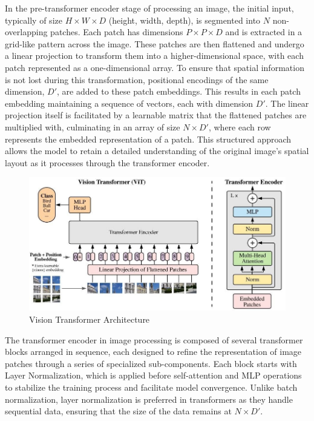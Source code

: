 In the pre-transformer encoder stage of processing an image, the initial input, typically of size \(H \times W \times D\) (height, width, depth), 
is segmented into \(N\) non-overlapping patches. Each patch has dimensions \(P \times P \times D\) and is extracted in a grid-like pattern across 
the image. These patches are then flattened and undergo a linear projection to transform them into a higher-dimensional space, with each patch represented 
as a one-dimensional array. To ensure that spatial information is not lost during this transformation, positional encodings of the same dimension, 
\(D'\), are added to these patch embeddings. This results in each patch embedding maintaining a sequence of vectors, each with dimension \(D'\). 
The linear projection itself is facilitated by a learnable matrix that the flattened patches are multiplied with, culminating in an array of size 
\(N \times D'\), where each row represents the embedded representation of a patch. This structured approach allows the model to retain a detailed 
understanding of the original image’s spatial layout as it processes through the transformer encoder.


\begin{figure}[h!]
    \centering
    \includegraphics[scale=0.45]{Figures/vision-transformer.jpg}
    \caption{Vision Transformer Architecture}
    \label{fig:tr-vit}
\end{figure}


The transformer encoder in image processing is composed of several transformer blocks arranged in sequence, each designed to refine the representation of image 
patches through a series of specialized sub-components. Each block starts with Layer Normalization, which is applied before self-attention and MLP operations 
to stabilize the training process and facilitate model convergence. Unlike batch normalization, layer normalization is preferred in transformers as they handle 
sequential data, ensuring that the size of the data remains at \(N \times D'\).

